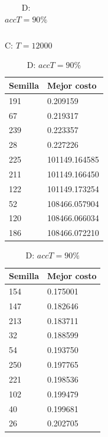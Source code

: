 \documentclass{article}
\begin{document}
\begin{table}[!htbp]
\begin{minipage}{.5\linewidth}
\begin{tabular}{l|l}
      \end{tabular}
    \end{minipage}
    \begin{minipage}{.5\linewidth}
      \centering
      \caption{C: $T = 12000$}
      \begin{tabular}{l|l}
        Semilla & Mejor costo \\
        \hline
        191     & 0.209159 \\
        \hline
        67      & 0.219317 \\
        \hline
        239     & 0.223357 \\
        \hline
        28      & 0.227226 \\
        \hline
        225     & 101149.164585 \\
        \hline
        211     & 101149.166450 \\
        \hline
        122     & 101149.173254 \\
        \hline
        52      & 108466.057904 \\
        \hline
        120     & 108466.066034 \\
        \hline
        186     & 108466.072210 \\
      \end{tabular}
    \end{minipage}
    \begin{minipage}{.5\linewidth}
      \centering
      \caption{D: $accT = 90 \%$}
      \begin{tabular}{l|l}
        Semilla & Mejor costo \\
        \hline
        154     & 0.175001 \\
        \hline
        147     & 0.182646 \\
        \hline
        213     & 0.183711 \\
        \hline
        32      & 0.188599 \\
        \hline
        54      & 0.193750 \\
        \hline
        250     & 0.197765 \\
        \hline
        221     & 0.198536 \\
        \hline
        102     & 0.199479 \\
        \hline
        40      & 0.199681 \\
        \hline
        26      & 0.202705 \\
      \end{tabular}
    \end{minipage}

\end{table}
\end{document}

